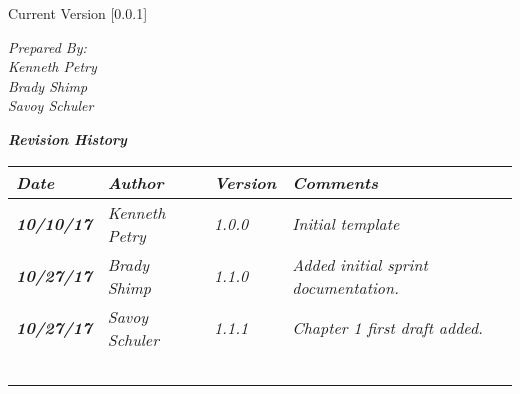 


Current Version [0.0.1]
\vspace*{5mm}

{\color{SDColor5}
\noindent
\textit{Prepared By:}\\
\textit{Kenneth Petry}\\
\textit{Brady Shimp}\\
\textit{Savoy Schuler}
}

\vfill
\noindent
{\color{SDColor3} \textit{\textbf{Revision History}}}\\
\begin{tabular}{|>{\raggedright}p{1.5cm}|>{\raggedright}p{3cm}|>{\raggedright}p{1.5cm}|>{\raggedright}p{9cm}|}
\hline
\textit{\textbf{Date}} &  \textit{\textbf{Author}} & \textit{\textbf{Version}} & \textit{\textbf{Comments}}\tabularnewline
\hline
 \textit{\textbf{10/10/17}} & \textit{Kenneth Petry} & \textit{1.0.0} & \textit{Initial template}\tabularnewline\hline
  \textit{\textbf{10/27/17}} & \textit{Brady Shimp} & \textit{1.1.0} & \textit{Added initial sprint documentation.}\tabularnewline\hline
\textit{\textbf{10/27/17}} & \textit{Savoy Schuler} & \textit{1.1.1} & \textit{Chapter 1 first draft added.}\tabularnewline
\hline
 &  &  & \tabularnewline
 \hline
 &  &  & \tabularnewline
\hline
 &  &  & \tabularnewline
\hline
 &  &  & \tabularnewline
\hline
 &  &  & \tabularnewline
\hline
\end{tabular}
\vfill

